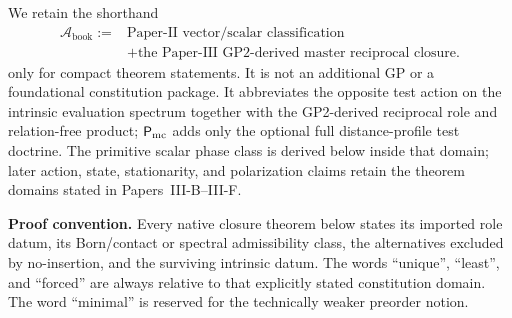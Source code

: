 \documentclass[12pt,a4paper]{article}
\begin{document}
\begin{definition}
\label{p3:def:reciprocal-vector-bookkeeping-package}
We retain the shorthand
\[
\begin{aligned}
\mathcal A_{\mathrm{book}}:={}&
\text{Paper-II vector/scalar classification}\\
&+\text{the Paper-III GP2-derived master reciprocal closure}.
\end{aligned}
\]
only for compact theorem statements.  It is not an additional GP or a
foundational constitution package.  It abbreviates the opposite test action
on the intrinsic evaluation spectrum together with the GP2-derived reciprocal
role and relation-free product; \(\mathsf P_{\rm mc}\) adds only the optional
full distance-profile test doctrine.  The primitive scalar phase class is derived
below inside that domain;
later action, state, stationarity, and polarization claims retain the theorem
domains stated in Papers~III-B--III-F.
\end{definition}


\noindent\textbf{Proof convention.}
Every native closure theorem below states its imported role datum, its
Born/contact or spectral admissibility class, the alternatives excluded by
no-insertion, and the surviving intrinsic datum.  The words ``unique'', ``least'', and ``forced'' are always relative to that explicitly stated constitution domain.  The word ``minimal'' is reserved for the technically weaker preorder notion.
\end{document}
